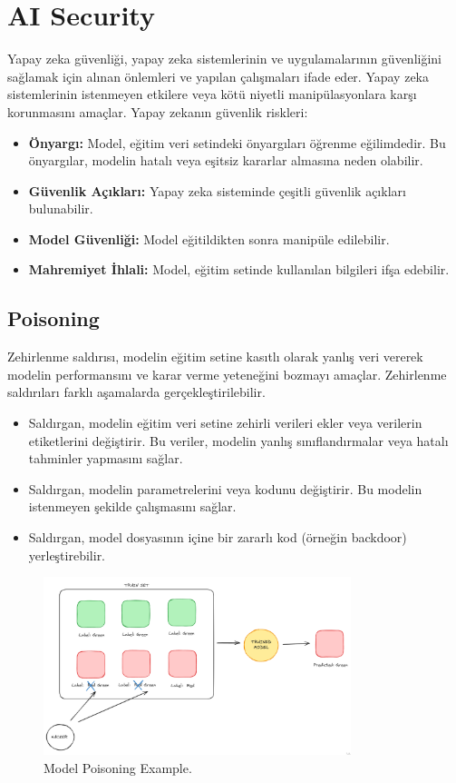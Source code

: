 \section{AI Security}
Yapay zeka güvenliği, yapay zeka sistemlerinin ve uygulamalarının güvenliğini sağlamak için alınan önlemleri ve yapılan çalışmaları ifade eder. Yapay zeka sistemlerinin istenmeyen etkilere veya kötü niyetli manipülasyonlara karşı korunmasını amaçlar. Yapay zekanın güvenlik riskleri:
\begin{itemize}
    \item \textbf{Önyargı:} Model, eğitim veri setindeki önyargıları öğrenme eğilimdedir. Bu önyargılar, modelin hatalı veya eşitsiz kararlar almasına neden olabilir.
    \item \textbf{Güvenlik Açıkları:} Yapay zeka sisteminde çeşitli güvenlik açıkları bulunabilir.
    \item \textbf{Model Güvenliği:} Model eğitildikten sonra manipüle edilebilir.
    \item \textbf{Mahremiyet İhlali:} Model, eğitim setinde kullanılan bilgileri ifşa edebilir.
\end{itemize}

\subsection{Poisoning}
Zehirlenme saldırısı, modelin eğitim setine kasıtlı olarak yanlış veri vererek modelin performansını ve karar verme yeteneğini bozmayı amaçlar. Zehirlenme saldırıları farklı aşamalarda gerçekleştirilebilir.
\begin{itemize}
    \item Saldırgan, modelin eğitim veri setine zehirli verileri ekler veya verilerin etiketlerini değiştirir. Bu veriler, modelin yanlış sınıflandırmalar veya hatalı tahminler yapmasını sağlar.
    \item Saldırgan, modelin parametrelerini veya kodunu değiştirir. Bu modelin istenmeyen şekilde çalışmasını sağlar.
    \item Saldırgan, model dosyasının içine bir zararlı kod (örneğin backdoor) yerleştirebilir.
\end{itemize}

\newpage

\begin{figure}[h]
  \centering
  \includegraphics[width=0.8\textwidth]{images/ai_sec_poisoning_attack.png}
  \caption{Model Poisoning Example.}
\end{figure}

